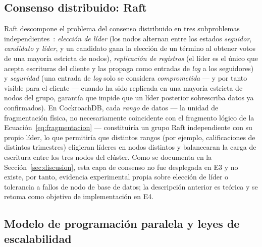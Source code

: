 \documentclass[12pt,a4paper]{article}
\begin{document}
\subsection{Consenso distribuido: Raft}
\label{sec:fundamento-raft}

Raft descompone el problema del consenso distribuido en tres subproblemas
independientes~\cite{ongaro2014raft}: \emph{elección de líder} (los nodos
alternan entre los estados \textit{seguidor}, \textit{candidato} y
\textit{líder}, y un candidato gana la elección de un término al obtener
votos de una mayoría estricta de nodos), \emph{replicación de registros}
(el líder es el único que acepta escrituras del cliente y las propaga como
entradas de \emph{log} a los seguidores) y \emph{seguridad} (una entrada de
\emph{log} solo se considera \emph{comprometida} --- y por tanto visible
para el cliente --- cuando ha sido replicada en una mayoría estricta de
nodos del grupo, garantía que impide que un líder posterior sobrescriba
datos ya confirmados). En CockroachDB, cada \emph{rango} de datos --- la
unidad de fragmentación física, no necesariamente coincidente con el
fragmento lógico de la Ecuación~\eqref{eq:fragmentacion} --- constituiría un
grupo Raft independiente con su propio líder, lo que permitiría que
distintos rangos (por ejemplo, calificaciones de distintos trimestres)
eligieran líderes en nodos distintos y balancearan la carga de escritura
entre los tres nodos del clúster. Como se documenta en la
Sección~\ref{sec:discusion}, esta capa de consenso no fue desplegada en E3
y no existe, por tanto, evidencia experimental propia sobre elección de
líder o tolerancia a fallos de nodo de base de datos; la descripción
anterior es teórica y se retoma como objetivo de implementación en E4.

\subsection{Modelo de programación paralela y leyes de escalabilidad}
\label{sec:fundamento-spark}
\end{document}
